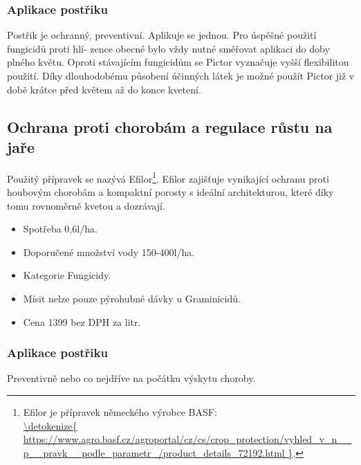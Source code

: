 \subsubsection{Aplikace postřiku}
Postřik je ochranný, preventivní. Aplikuje se jednou. Pro úspěšné použití fungicidů proti hlí-
zence obecné bylo vždy nutné směřovat aplikaci do doby plného květu. 
Oproti stávajícím fungicidům se Pictor vyznačuje vyšší flexibilitou použití. Díky dlouhodobému působení účinných látek je
možné použít Pictor již v době krátce před květem až do konce kvetení.


\subsection{Ochrana proti chorobám a regulace růstu na jaře}
Použitý přípravek se nazývá Efilor\footnote{Efilor je přípravek německého výrobce BASF: \\\url{\detokenize{
https://www.agro.basf.cz/agroportal/cz/cs/crop_protection/vyhled_v_n__p__pravk__podle_parametr_/product_details_72192.html
}}.}.
Efilor zajišťuje vynikající ochranu proti houbovým chorobám a kompaktní porosty s ideální architekturou, které díky tomu rovnoměrně kvetou a dozrávají.
\begin{itemize}
  \item Spotřeba 0,6l/ha.
  \item Doporučené množství vody 150-400l/ha.
  \item Kategorie Fungicidy.
  \item Mísit nelze pouze pýrohubné dávky u Graminicidů.
  \item Cena 1399 bez DPH za litr.
\end{itemize}

\subsubsection{Aplikace postřiku}
Preventivně nebo co nejdříve na počátku výskytu choroby.

